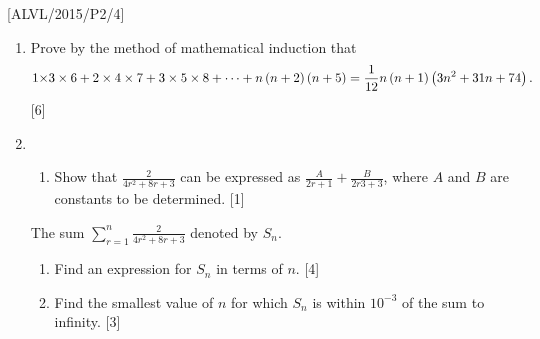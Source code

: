 \item {[}ALVL/2015/P2/4{]}
\begin{enumerate}
\item Prove by the method of mathematical induction that 
\[
\text{1\ensuremath{\times3\times6+2\times4\times7+3\times5\times8}}+\dots+n\left(n+2\right)\left(n+5\right)=\frac{1}{12}n\left(n+1\right)\left(3n^{2}+31n+74\right).
\]
 \hfill{}{[}6{]}
\item {}
\begin{enumerate}
\item Show that $\frac{2}{4r^{2}+8r+3}$ can be expressed as $\frac{A}{2r+1}+\frac{B}{2r3+3}$,
where $A$ and $B$ are constants to be determined. \hfill{}{[}1{]}
\end{enumerate}
The sum $\sum_{r=1}^{n}\frac{2}{4r^{2}+8r+3}$ denoted by $S_{n}$. 
\begin{enumerate}
\item Find an expression for $S_{n}$ in terms of $n$. \hfill{}{[}4{]}
\item Find the smallest value of $n$ for which $S_{n}$ is within $10^{-3}$
of the sum to infinity. \hfill{}{[}3{]}
\end{enumerate}
\end{enumerate}
